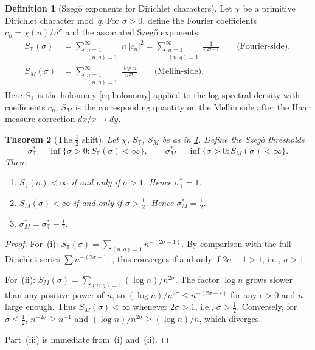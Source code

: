 \documentclass[12pt]{amsart}
\newtheorem{theorem}{Theorem}[section]
\theoremstyle{definition}
\newtheorem{definition}[theorem]{Definition}
\theoremstyle{remark}
\newcommand{\bT}{\mathbb{T}}
\begin{document}
\begin{definition}[Szeg\H{o} exponents for Dirichlet characters]\label{def:szego-exponent}
Let $\chi$ be a primitive Dirichlet character mod~$q$. For $\sigma > 0$, define the Fourier coefficients $c_n = \chi(n)/n^\sigma$ and the associated Szeg\H{o} exponents:
\begin{align}
S_{\bT}(\sigma) &= \sum_{\substack{n=1 \\ (n,q)=1}}^{\infty} n\,|c_n|^2 = \sum_{\substack{n=1 \\ (n,q)=1}}^{\infty} \frac{1}{n^{2\sigma - 1}}
\qquad\text{(Fourier-side)}, \label{eq:fourier-szego} \\
S_M(\sigma) &= \sum_{\substack{n=1 \\ (n,q)=1}}^{\infty} \frac{\log n}{n^{2\sigma}}
\qquad\text{(Mellin-side)}. \label{eq:mellin-szego}
\end{align}
Here $S_{\bT}$ is the holonomy \eqref{eq:holonomy} applied to the log-spectral density with coefficients $c_n$; $S_M$ is the corresponding quantity on the Mellin side after the Haar measure correction $dx/x \to dy$.
\end{definition}

\begin{theorem}[The $\frac{1}{2}$ shift]\label{thm:half-shift}
Let $\chi$, $S_{\bT}$, $S_M$ be as in \cref{def:szego-exponent}. Define the Szeg\H{o} thresholds
\[
\sigma_{\bT}^* = \inf\{\sigma > 0 : S_{\bT}(\sigma) < \infty\}, \qquad
\sigma_M^* = \inf\{\sigma > 0 : S_M(\sigma) < \infty\}.
\]
Then:
\begin{enumerate}[label=(\roman*)]
\item $S_{\bT}(\sigma) < \infty$ if and only if $\sigma > 1$. Hence $\sigma_{\bT}^* = 1$.
\item $S_M(\sigma) < \infty$ if and only if $\sigma > \tfrac{1}{2}$. Hence $\sigma_M^* = \tfrac{1}{2}$.
\item $\sigma_M^* = \sigma_{\bT}^* - \tfrac{1}{2}$.
\end{enumerate}
\end{theorem}

\begin{proof}
For~(i): $S_{\bT}(\sigma) = \sum_{(n,q)=1} n^{-(2\sigma-1)}$. By comparison with the full Dirichlet series $\sum n^{-(2\sigma-1)}$, this converges if and only if $2\sigma - 1 > 1$, i.e., $\sigma > 1$.

For~(ii): $S_M(\sigma) = \sum_{(n,q)=1} (\log n)/n^{2\sigma}$. The factor $\log n$ grows slower than any positive power of $n$, so $(\log n)/n^{2\sigma} \leq n^{-(2\sigma - \epsilon)}$ for any $\epsilon > 0$ and $n$ large enough. Thus $S_M(\sigma) < \infty$ whenever $2\sigma > 1$, i.e., $\sigma > \tfrac{1}{2}$. Conversely, for $\sigma \leq \tfrac{1}{2}$, $n^{-2\sigma} \geq n^{-1}$ and $(\log n)/n^{2\sigma} \geq (\log n)/n$, which diverges.

Part~(iii) is immediate from~(i) and~(ii).
\end{proof}
\end{document}

